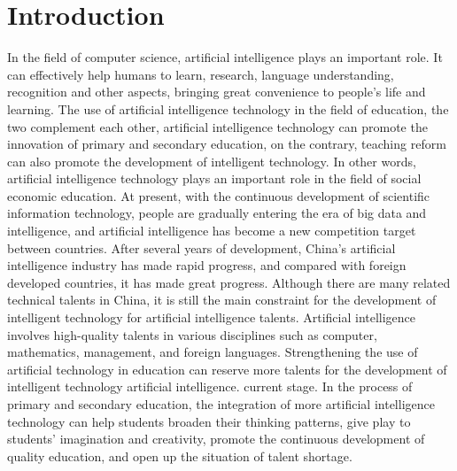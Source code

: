 \documentclass[lang=en,11pt,a4paper,towcolumn]{elegantpaper}
\begin{document}
\section{Introduction}
In the field of computer science, artificial intelligence plays an important role. It can effectively help humans to learn, research, language understanding, recognition and other aspects, bringing great convenience to people's life and learning. The use of artificial intelligence technology in the field of education, the two complement each other, artificial intelligence technology can promote the innovation of primary and secondary education, on the contrary, teaching reform can also promote the development of intelligent technology. In other words, artificial intelligence technology plays an important role in the field of social economic education.
At present, with the continuous development of scientific information technology, people are gradually entering the era of big data and intelligence, and artificial intelligence has become a new competition target between countries. After several years of development, China's artificial intelligence industry has made rapid progress, and compared with foreign developed countries, it has made great progress. Although there are many related technical talents in China, it is still the main constraint for the development of intelligent technology for artificial intelligence talents. Artificial intelligence involves high-quality talents in various disciplines such as computer, mathematics, management, and foreign languages. Strengthening the use of artificial technology in education can reserve more talents for the development of intelligent technology artificial intelligence. current stage. In the process of primary and secondary education, the integration of more artificial intelligence technology can help students broaden their thinking patterns, give play to students' imagination and creativity, promote the continuous development of quality education, and open up the situation of talent shortage.
\end{document}
